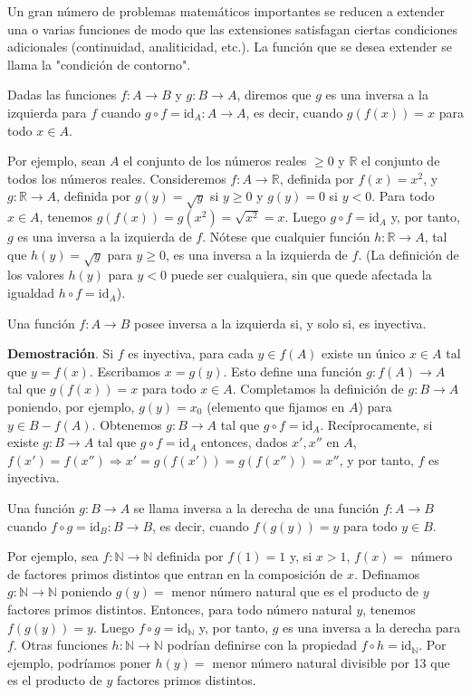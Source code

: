 \documentclass[12pt,oneside]{book}
\begin{document}
Un gran número de problemas matemáticos importantes se reducen a extender una o varias funciones de modo que las extensiones satisfagan ciertas condiciones adicionales (continuidad, analiticidad, etc.). La función que se desea extender se llama la "condición de contorno".

Dadas las funciones \(f: A \to B\) y \(g: B \to A\), diremos que \(g\) es una inversa a la izquierda para \(f\) cuando \(g \circ f = \text{id}_A: A \to A\), es decir, cuando \(g(f(x)) = x\) para todo \(x \in A\).

Por ejemplo, sean \(A\) el conjunto de los números reales \(\geq 0\) y \(\mathbb{R}\) el conjunto de todos los números reales. Consideremos \(f: A \to \mathbb{R}\), definida por \(f(x) = x^2\), y \(g: \mathbb{R} \to A\), definida por \(g(y) = \sqrt{y}\) si \(y \geq 0\) y \(g(y) = 0\) si \(y < 0\). Para todo \(x \in A\), tenemos \(g(f(x)) = g(x^2) = \sqrt{x^2} = x\). Luego \(g \circ f = \text{id}_A\) y, por tanto, \(g\) es una inversa a la izquierda de \(f\). Nótese que cualquier función \(h: \mathbb{R} \to A\), tal que \(h(y) = \sqrt{y}\) para \(y \geq 0\), es una inversa a la izquierda de \(f\). (La definición de los valores \(h(y)\) para \(y < 0\) puede ser cualquiera, sin que quede afectada la igualdad \(h \circ f = \text{id}_A\)).

Una función \(f: A \to B\) posee inversa a la izquierda si, y solo si, es inyectiva.

\textbf{Demostración}. Si \(f\) es inyectiva, para cada \(y \in f(A)\) existe un único \(x \in A\) tal que \(y = f(x)\). Escribamos \(x = g(y)\). Esto define una función \(g: f(A) \to A\) tal que \(g(f(x)) = x\) para todo \(x \in A\). Completamos la definición de \(g: B \to A\) poniendo, por ejemplo, \(g(y) = x_0\) (elemento que fijamos en \(A\)) para \(y \in B - f(A)\). Obtenemos \(g: B \to A\) tal que \(g \circ f = \text{id}_A\). Recíprocamente, si existe \(g: B \to A\) tal que \(g \circ f = \text{id}_A\) entonces, dados \(x', x''\) en \(A\), \(f(x') = f(x'') \Rightarrow x' = g(f(x')) = g(f(x'')) = x''\), y por tanto, \(f\) es inyectiva.

Una función \(g: B \to A\) se llama inversa a la derecha de una función \(f: A \to B\) cuando \(f \circ g = \text{id}_B: B \to B\), es decir, cuando \(f(g(y)) = y\) para todo \(y \in B\).

Por ejemplo, sea \(f: \mathbb{N} \to \mathbb{N}\) definida por \(f(1) = 1\) y, si \(x > 1\), \(f(x) =\) número de factores primos distintos que entran en la composición de \(x\). Definamos \(g: \mathbb{N} \to \mathbb{N}\) poniendo \(g(y) =\) menor número natural que es el producto de \(y\) factores primos distintos. Entonces, para todo número natural \(y\), tenemos \(f(g(y)) = y\). Luego \(f \circ g = \text{id}_{\mathbb{N}}\) y, por tanto, \(g\) es una inversa a la derecha para \(f\). Otras funciones \(h: \mathbb{N} \to \mathbb{N}\) podrían definirse con la propiedad \(f \circ h = \text{id}_{\mathbb{N}}\). Por ejemplo, podríamos poner \(h(y) =\) menor número natural divisible por 13 que es el producto de \(y\) factores primos distintos.
\end{document}
